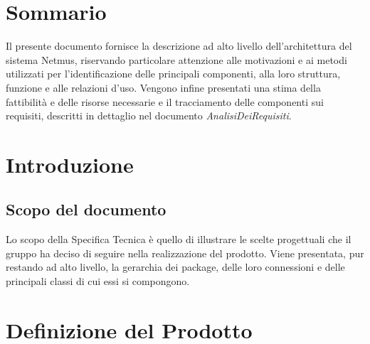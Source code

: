 \begin{longtable}{|p{}|c|p{}|p{}|}
\end{longtable}

\tableofcontents

\chapter*{Sommario}
Il presente documento fornisce la descrizione ad alto livello dell'architettura
del sistema Netmus, riservando particolare attenzione alle motivazioni e ai
metodi utilizzati per l'identificazione delle principali componenti, alla loro
struttura, funzione e alle relazioni d'uso. Vengono infine presentati una stima
della fattibilit\`a e delle risorse necessarie e il tracciamento delle
componenti sui requisiti, descritti in dettaglio nel documento
\emph{AnalisiDeiRequisiti}.


\thispagestyle{fancy} %

\chapter{Introduzione}
\thispagestyle{fancy} %

\section{Scopo del documento}
Lo scopo della Specifica Tecnica \`e quello di illustrare le scelte progettuali
che il gruppo ha deciso di seguire nella realizzazione del prodotto. Viene
presentata, pur restando ad alto livello, la gerarchia dei package, delle loro
connessioni e delle principali classi di cui essi si compongono.



\chapter{Definizione del Prodotto}
